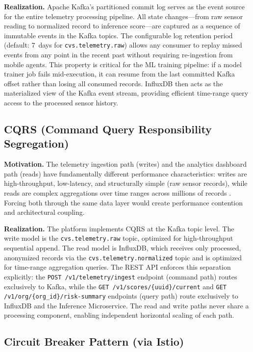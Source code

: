 \documentclass[conference]{IEEEtran}
\begin{document}
\textbf{Realization.} Apache Kafka's partitioned commit log serves as the event source
for the entire telemetry processing pipeline. All state changes---from raw sensor
reading to normalized record to inference score---are captured as a sequence of immutable
events in the Kafka topics. The configurable log retention period (default: 7~days for
\texttt{cvs.telemetry.raw}) allows any consumer to replay missed events from any
point in the recent past without requiring re-ingestion from mobile agents. This property
is critical for the ML training pipeline: if a model trainer job fails mid-execution,
it can resume from the last committed Kafka offset rather than losing all consumed
records. InfluxDB then acts as the materialized view of the Kafka event stream,
providing efficient time-range query access to the processed sensor history.

\subsection{CQRS (Command Query Responsibility Segregation)}

\textbf{Motivation.} The telemetry ingestion path (writes) and the analytics dashboard
path (reads) have fundamentally different performance characteristics: writes are
high-throughput, low-latency, and structurally simple (raw sensor records), while reads
are complex aggregations over time ranges across millions of records \cite{b28}.
Forcing both through the same data layer would create performance contention and
architectural coupling.

\textbf{Realization.} The platform implements CQRS at the Kafka topic level. The write
model is the \texttt{cvs.telemetry.raw} topic, optimized for high-throughput sequential
append. The read model is InfluxDB, which receives only processed, anonymized records
via the \texttt{cvs.telemetry.normalized} topic and is optimized for time-range
aggregation queries. The REST API enforces this separation explicitly: the
\texttt{POST /v1/telemetry/ingest} endpoint (command path) routes exclusively to Kafka,
while the \texttt{GET /v1/scores/\{uuid\}/current} and
\texttt{GET /v1/org/\{org\_id\}/risk-summary} endpoints (query path) route exclusively
to InfluxDB and the Inference Microservice. The read and write paths never share a
processing component, enabling independent horizontal scaling of each path.

\subsection{Circuit Breaker Pattern (via Istio)}
\end{document}
